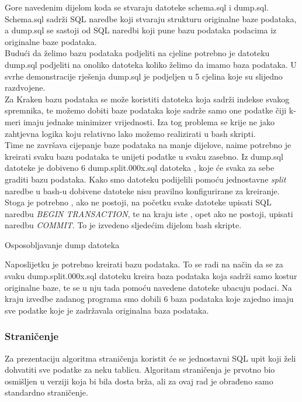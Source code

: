 \documentclass[times, utf8, zavrsni]{fer}
\begin{document}
Gore navedenim dijelom koda se stvaraju datoteke schema.sql i dump.sql. Schema.sql sadrži SQL naredbe koji stvaraju strukturu originalne baze podataka, a dump.sql se sastoji od SQL naredbi koji pune bazu podataka podacima iz originalne baze podataka.
\\Budući da želimo bazu podataka podjeliti na cjeline potrebno je datoteku dump.sql podjeliti na onoliko datoteka koliko želimo da imamo baza podataka. U svrhe demonstracije rješenja dump.sql je podjeljen u 5 cjelina koje su slijedno razdvojene. \\Za Kraken bazu podataka se može koristiti datoteka koja sadrži indekse svakog spremnika, te možemo dobiti baze podataka koje sadrže samo one podatke čiji k-meri imaju jednake minimizer vrijednosti. Iza tog problema se krije ne jako zahtjevna logika koju relativno lako možemo realizirati u bash skripti.
\\Time ne završava cijepanje baze podataka na manje dijelove, naime potrebno je kreirati svaku bazu podataka te unijeti podatke u svaku zasebno. Iz dump.sql datoteke je dobiveno 6 dump.split.000x.sql datoteka , koje će svaka za sebe graditi bazu podataka. Kako smo datoteku podijelili pomoću jednostavne \textit{split} naredbe u bash-u dobivene datoteke nisu pravilno konfigurirane za kreiranje. Stoga je potrebno , ako ne postoji, na početku svake datoteke upisati SQL naredbu  \textit{BEGIN TRANSACTION}, te na kraju iste , opet ako ne postoji, upisati naredbu \textit{COMMIT}. To je izvedeno sljedećim dijelom bash skripte.

\begin{algorithm}[H]
	\caption{Osposobljavanje dump datoteka}
	\label{DumpBp}
\end{algorithm}

Naposlijetku je potrebno kreirati bazu podataka. To se radi na način da se za svaku dump.split.000x.sql datoteku kreira baza podataka koja sadrži samo kostur originalne baze, te se u nju tada pomoću navedene datoteke ubacuju podaci. Na kraju izvedbe zadanog programa smo dobili 6 baza podataka koje zajedno imaju sve podatke koje je zadržavala originalna baza podataka.

\subsubsection{Straničenje}
Za prezentaciju algoritma straničenja koristit će se jednostavni SQL upit koji želi dohvatiti sve podatke za neku tablicu. Algoritam straničenja je prvotno bio osmišljen u verziji koja bi bila dosta brža, ali za ovaj rad je obrađeno samo standardno straničenje.
\end{document}
